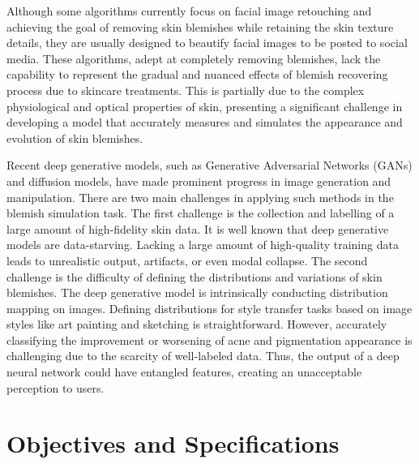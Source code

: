 \begin{spacing}{1.5}
Although some algorithms currently focus on facial image retouching and achieving the goal of removing skin blemishes while retaining the skin texture details, they are usually designed to beautify facial images to be posted to social media\cite{xieBlemishawareProgressiveFace2023, linExemplarbasedFreckleRetouching2019, shafaeiAutoRetouchAutomaticProfessional2021}. These algorithms, adept at completely removing blemishes, lack the capability to represent the gradual and nuanced effects of blemish recovering process due to skincare treatments. This is partially due to the complex physiological and optical properties of skin, presenting a significant challenge in developing a model that accurately measures and simulates the appearance and evolution of skin blemishes.

Recent deep generative models, such as Generative Adversarial Networks\cite{goodfellowGenerativeAdversarialNetworks2014} (GANs) and diffusion models\cite{DBLP:conf/nips/HoJA20,rombach2021highresolution}, have made prominent progress in image generation and manipulation. There are two main challenges in applying such methods in the blemish simulation task. The first challenge is the collection and labelling of a large amount of high-fidelity skin data. It is well known that deep generative models are data-starving. Lacking a large amount of high-quality training data leads to unrealistic output, artifacts, or even modal collapse. The second challenge is the difficulty of defining the distributions and variations of skin blemishes. The deep generative model is intrinsically conducting distribution mapping on images. Defining distributions for style transfer\cite{DBLP:conf/iclr/DumoulinSK17,DBLP:conf/iccv/ZhuPIE17, DBLP:journals/corr/GatysEB15a} tasks based on image styles like art painting and sketching is straightforward. However, accurately classifying the improvement or worsening of acne and pigmentation appearance is challenging due to the scarcity of well-labeled data. Thus, the output of a deep neural network could have entangled features, creating an unacceptable perception to users.


\section{Objectives and Specifications}


\end{spacing}
